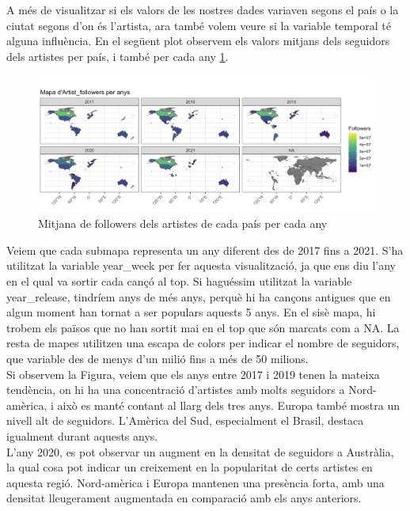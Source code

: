 A més de visualitzar si els valors de les nostres dades variaven segons el país o la ciutat segons d'on és l'artista, ara també volem veure si la variable temporal té alguna influència. En el següent plot observem els valors mitjans dels seguidors dels artistes per país, i també per cada any \ref{fig:geo_mean_year_follow}.

\begin{figure}[H]
    \centering
    \includegraphics[width=0.8\linewidth]{Images/7_Geospatial/1_descriptive/mapa_artist_followers_years.png}
    \caption{Mitjana de followers dels artistes de cada país per cada any}
    \label{fig:geo_mean_year_follow}
\end{figure}

Veiem que cada submapa representa un any diferent des de 2017 fins a 2021. S'ha utilitzat la variable year\_week per fer aquesta visualització, ja que ens diu l'any en el qual va sortir cada cançó al top. Si haguéssim utilitzat la variable year\_release, tindríem anys de més anys, perquè hi ha cançons antigues que en algun moment han tornat a ser populars aquests 5 anys. En el sisè mapa, hi trobem els països que no han sortit mai en el top que són marcats com a NA. La resta de mapes utilitzen una escapa de colors per indicar el nombre de seguidors, que variable des de menys d'un milió fins a més de 50 milions. \\

Si observem la Figura, veiem que els anys entre 2017 i 2019 tenen la mateixa tendència, on hi ha una concentració d'artistes amb molts seguidors a Nord-amèrica, i això es manté contant al llarg dels tres anys. Europa també mostra un nivell alt de seguidors. L'Amèrica del Sud, especialment el Brasil, destaca igualment durant aquests anys. \\

L'any 2020, es pot observar un augment en la densitat de seguidors a Austràlia, la qual cosa pot indicar un creixement en la popularitat de certs artistes en aquesta regió.
Nord-amèrica i Europa mantenen una presència forta, amb una densitat lleugerament augmentada en comparació amb els anys anteriors. \\

